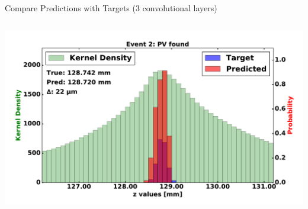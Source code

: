 \begin{frame}{Compare Predictions with Targets (3 convolutional layers)}
\begin{columns}[c]
\begin{center}
           \includegraphics[width=1\textwidth, height=0.45\textwidth, trim=18 0 18 0]{images/120000_3layer_15.pdf}
       \end{center}
  \end{columns}
\end{frame}






